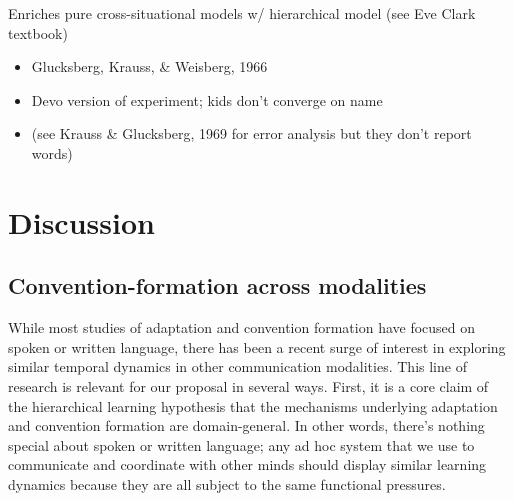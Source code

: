 \documentclass[11pt, floatsintext, jou]{apa6}
\begin{document}
Enriches pure cross-situational models w/ hierarchical model (see Eve Clark textbook)

\begin{itemize}
\item Glucksberg, Krauss, \& Weisberg, 1966
\item Devo version of experiment; kids don't converge on name
\item (see Krauss \& Glucksberg, 1969 for error analysis but they don't report words)
\end{itemize}

\section{Discussion}

\subsection{Convention-formation across modalities}


While most studies of adaptation and convention formation have focused on spoken or written language, there has been a recent surge of interest in exploring similar temporal dynamics in other communication modalities. This line of research is relevant for our proposal in several ways. First, it is a core claim of the hierarchical learning hypothesis that the mechanisms underlying adaptation and convention formation are domain-general. In other words, there's nothing special about spoken or written language; any ad hoc system that we use to communicate and coordinate with other minds should display similar learning dynamics because they are all subject to the same functional pressures. 
\end{document}
